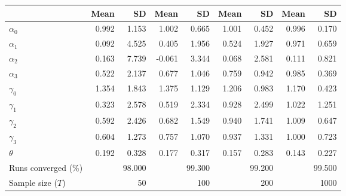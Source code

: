 
\begin{tabular}[t]{lrrrrrrrr}
\toprule
  & Mean & SD & Mean  & SD  & Mean   & SD   & Mean    & SD   \\
\midrule
$\alpha_{0}$ & 0.992 & 1.153 & 1.002 & 0.665 & 1.001 & 0.452 & 0.996 & 0.170\\
$\alpha_{1}$ & 0.092 & 4.525 & 0.405 & 1.956 & 0.524 & 1.927 & 0.971 & 0.659\\
$\alpha_{2}$ & 0.163 & 7.739 & -0.061 & 3.344 & 0.068 & 2.581 & 0.111 & 0.821\\
$\alpha_{3}$ & 0.522 & 2.137 & 0.677 & 1.046 & 0.759 & 0.942 & 0.985 & 0.369\\
$\gamma_{0}$ & 1.354 & 1.843 & 1.375 & 1.129 & 1.206 & 0.983 & 1.170 & 0.423\\
$\gamma_{1}$ & 0.323 & 2.578 & 0.519 & 2.334 & 0.928 & 2.499 & 1.022 & 1.251\\
$\gamma_{2}$ & 0.592 & 2.426 & 0.682 & 1.549 & 0.940 & 1.741 & 1.009 & 0.647\\
$\gamma_{3}$ & 0.604 & 1.273 & 0.757 & 1.070 & 0.937 & 1.331 & 1.000 & 0.723\\
$\theta$ & 0.192 & 0.328 & 0.177 & 0.317 & 0.157 & 0.283 & 0.143 & 0.227\\
Runs converged (\%) &  & 98.000 &  & 99.300 &  & 99.200 &  & 99.500\\
Sample size ($T$) &  & 50 &  & 100 &  & 200 &  & 1000\\
\bottomrule
\end{tabular}
